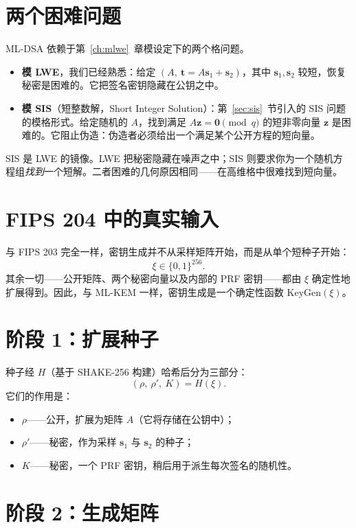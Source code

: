 \section{两个困难问题}

ML-DSA 依赖于第~\ref{ch:mlwe}~章模设定下的两个格问题。

\begin{itemize}
  \item \textbf{模 LWE}，我们已经熟悉：给定 $(A,\ \mathbf{t}=A\mathbf{s}_1+\mathbf{s}_2)$，其中 $\mathbf{s}_1,\mathbf{s}_2$ 较短，恢复秘密是困难的。它把签名密钥隐藏在公钥之中。
  \item \textbf{模 SIS}（短整数解，Short Integer Solution）：第~\ref{sec:sis}~节引入的 SIS 问题的模格形式。给定随机的 $A$，找到满足 $A\mathbf{z}=\mathbf{0}\pmod q$ 的短非零向量 $\mathbf{z}$ 是困难的。它阻止伪造：伪造者必须给出一个满足某个公开方程的短向量。
\end{itemize}

SIS 是 LWE 的镜像。LWE 把秘密隐藏在噪声之中；SIS 则要求你为一个随机方程组\emph{找到}一个短解。二者困难的几何原因相同——在高维格中很难找到短向量。

\section{FIPS 204 中的真实输入}

与 FIPS 203 完全一样，密钥生成并不从采样矩阵开始，而是从单个短种子开始：
\[
\xi \in \{0,1\}^{256}.
\]
其余一切——公开矩阵、两个秘密向量以及内部的 PRF 密钥——都由 $\xi$ 确定性地扩展得到。因此，与 ML-KEM 一样，密钥生成是一个确定性函数 $\mathrm{KeyGen}(\xi)$。

\section{阶段 1：扩展种子}

种子经 $H$（基于 SHAKE-256 构建）哈希后分为三部分：
\[
(\rho,\ \rho',\ K) = H(\xi).
\]
它们的作用是：
\begin{itemize}
  \item $\rho$——公开，扩展为矩阵 $A$（它将存储在公钥中）；
  \item $\rho'$——秘密，作为采样 $\mathbf{s}_1$ 与 $\mathbf{s}_2$ 的种子；
  \item $K$——秘密，一个 PRF 密钥，稍后用于派生每次签名的随机性。
\end{itemize}

\section{阶段 2：生成矩阵}

